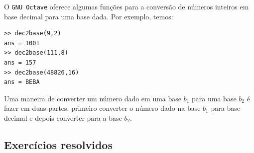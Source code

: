 \begin{obs}
  O \verb+GNU Octave+ oferece algumas funções para a conversão de números inteiros em base decimal para uma base dada. Por exemplo, temos:
\begin{verbatim}
>> dec2base(9,2)
ans = 1001
>> dec2base(111,8)
ans = 157
>> dec2base(48826,16)
ans = BEBA
\end{verbatim}
\end{obs}


\begin{obs}
  Uma maneira de converter um número dado em uma base $b_1$ para uma base $b_2$ é fazer em duas partes: primeiro converter o número dado na base $b_1$ para base decimal e depois converter para a base $b_2$.
\end{obs}

\subsection*{Exercícios resolvidos}

\construirExeresol

